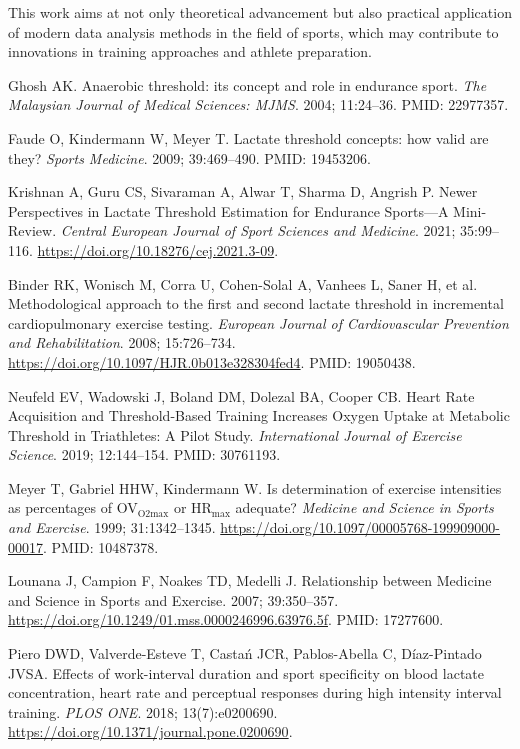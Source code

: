 \documentclass[a4paper,fleqn]{cas-dc}
\begin{document}
This work aims at not only theoretical advancement but also practical application of modern data analysis methods in the field of sports, which may contribute to innovations in training approaches and athlete preparation.



\begin{thebibliography}{}

 Ghosh AK. Anaerobic threshold: its concept and role in endurance sport. \textit{The Malaysian Journal of Medical Sciences: MJMS}. 2004; 11:24–36. PMID: 22977357.

 Faude O, Kindermann W, Meyer T. Lactate threshold concepts: how valid are they? \textit{Sports Medicine}. 2009; 39:469–490. PMID: 19453206.

 Krishnan A, Guru CS, Sivaraman A, Alwar T, Sharma D, Angrish P. Newer Perspectives in Lactate Threshold Estimation for Endurance Sports—A Mini-Review. \textit{Central European Journal of Sport Sciences and Medicine}. 2021; 35:99–116. \url{https://doi.org/10.18276/cej.2021.3-09}.

 Binder RK, Wonisch M, Corra U, Cohen-Solal A, Vanhees L, Saner H, et al. Methodological approach to the first and second lactate threshold in incremental cardiopulmonary exercise testing. \textit{European Journal of Cardiovascular Prevention and Rehabilitation}. 2008; 15:726–734. \url{https://doi.org/10.1097/HJR.0b013e328304fed4}. PMID: 19050438.

 Neufeld EV, Wadowski J, Boland DM, Dolezal BA, Cooper CB. Heart Rate Acquisition and Threshold-Based Training Increases Oxygen Uptake at Metabolic Threshold in Triathletes: A Pilot Study. \textit{International Journal of Exercise Science}. 2019; 12:144–154. PMID: 30761193.

 Meyer T, Gabriel HHW, Kindermann W. Is determination of exercise intensities as percentages of OV$_{\text{O2max}}$ or HR$_{\text{max}}$ adequate? \textit{Medicine and Science in Sports and Exercise}. 1999; 31:1342–1345. \url{https://doi.org/10.1097/00005768-199909000-00017}. PMID: 10487378.

 Lounana J, Campion F, Noakes TD, Medelli J. Relationship between Medicine and Science in Sports and Exercise. 2007; 39:350–357. \url{https://doi.org/10.1249/01.mss.0000246996.63976.5f}. PMID: 17277600.

 Piero DWD, Valverde-Esteve T, Casta\'{n} JCR, Pablos-Abella C, D\'{i}az-Pintado JVSA. Effects of work-interval duration and sport specificity on blood lactate concentration, heart rate and perceptual responses during high intensity interval training. \textit{PLOS ONE}. 2018; 13(7):e0200690. \url{https://doi.org/10.1371/journal.pone.0200690}.


\end{thebibliography}
\end{document}
